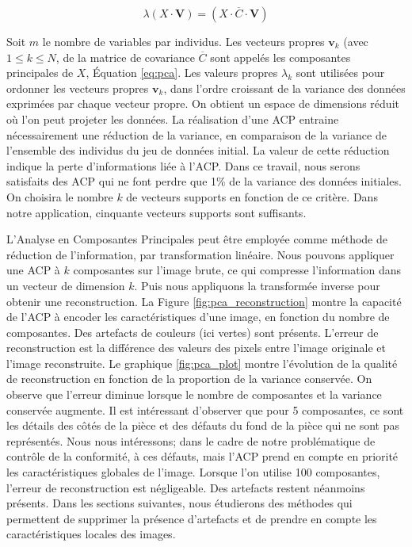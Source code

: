 \begin{equation} \label{eq:pca}
\lambda\left(X \cdot \mathbf{V}\right)=\left(X \cdot \overline{C} \cdot \mathbf{V}\right)
\end{equation}

Soit $m$ le nombre de variables par individus. Les vecteurs propres $\mathbf{v}_k$ (avec $1 \leq k \leq N$, de la matrice de covariance $\overline{C}$ sont appelés les composantes principales de $X$, Équation \ref{eq:pca}.
Les valeurs propres $\lambda_k$ sont utilisées pour ordonner les vecteurs propres $\mathbf{v}_k$, dans l'ordre croissant de la variance des données exprimées par chaque vecteur propre.
On obtient un espace de dimensions réduit où l'on peut projeter les données.
La réalisation d'une ACP entraine nécessairement une réduction de la variance, en comparaison de la variance de l'ensemble des individus du jeu de données initial.
La valeur de cette réduction indique la perte d'informations liée à l'ACP.
Dans ce travail, nous serons satisfaits des ACP qui ne font perdre que 1\% de la variance des données initiales.
On choisira le nombre $k$ de vecteurs supports en fonction de ce critère.
Dans notre application, cinquante vecteurs supports sont suffisants. 

L'Analyse en Composantes Principales peut être employée comme méthode de réduction de l'information, par transformation linéaire.
Nous pouvons appliquer une ACP à $k$ composantes sur l'image brute, ce qui compresse l'information dans un vecteur de dimension $k$.
Puis nous appliquons la transformée inverse pour obtenir une reconstruction.
La Figure \ref{fig:pca_reconstruction} montre la capacité de l'ACP à encoder les caractéristiques d'une image, en fonction du nombre de composantes.
Des artefacts de couleurs (ici vertes) sont présents.
L'erreur de reconstruction est la différence des valeurs des pixels entre l'image originale et l'image reconstruite.
Le graphique \ref{fig:pca_plot} montre l'évolution de la qualité de reconstruction en fonction de la proportion de la variance conservée.
On observe que l'erreur diminue lorsque le nombre de composantes et la variance conservée augmente.
Il est intéressant d'observer que pour 5 composantes, ce sont les détails des côtés de la pièce et des défauts du fond de la pièce qui ne sont pas représentés.
Nous nous intéressons; dans le cadre de notre problématique de contrôle de la conformité, à ces défauts, mais l'ACP prend en compte en priorité les caractéristiques globales de l'image.
Lorsque l'on utilise 100 composantes, l'erreur de reconstruction est négligeable.
Des artefacts restent néanmoins présents.
Dans les sections suivantes, nous étudierons des méthodes qui permettent de supprimer la présence d'artefacts et de prendre en compte les caractéristiques locales des images.

